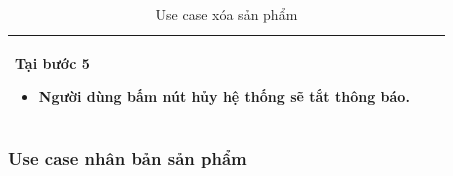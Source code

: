 \documentclass[12pt,a4paper]{article}
\begin{document}
\begin{table}[H]
\begin{tabular}{|p{3.5cm}|p{11.5cm}|c|}
            Tại bước 5\newline
            \vspace{-.8cm}\begin{itemize}
                              \item Người dùng bấm nút hủy hệ thống sẽ tắt thông báo.
            \end{itemize} \\
            \hline
        \end{tabular}
        \caption{Use case xóa sản phẩm }

    \end{table}

    \subsubsection*{Use case nhân bản sản phẩm }
\end{document}
